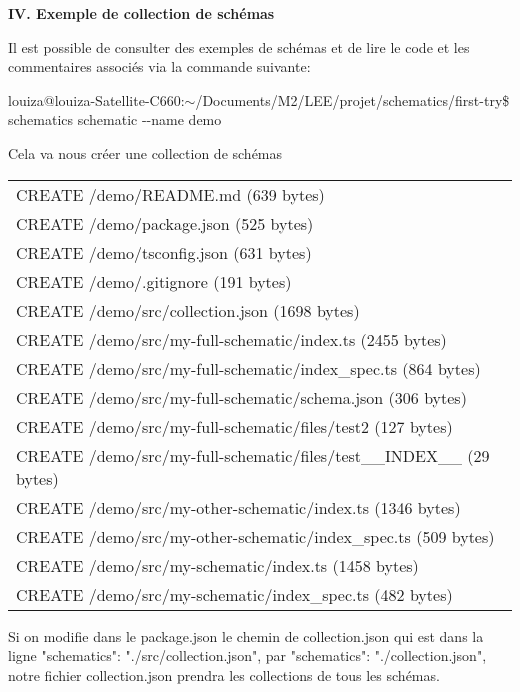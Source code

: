 \documentclass[12pt,french]{article}
\begin{document}
	\textbf{IV. Exemple de collection de schémas}\newline
	
	Il est possible de consulter des exemples  de schémas et de lire le code et les commentaires associés via la commande suivante:\newline
	
	louiza@louiza-Satellite-C660:$\sim$/Documents/M2/LEE/projet/schematics/first-try\$ schematics schematic \--\--name demo\newline
	
	Cela va nous créer une collection de schémas\newline
		
	\begin{tabular}{l}
		CREATE /demo/README.md (639 bytes)\\
		CREATE /demo/package.json (525 bytes)
\\
		CREATE /demo/tsconfig.json (631 bytes)
\\
		CREATE /demo/.gitignore (191 bytes)
\\
		CREATE /demo/src/collection.json (1698 bytes)\\
		CREATE /demo/src/my-full-schematic/index.ts (2455 bytes)
\\
		CREATE /demo/src/my-full-schematic/index\_spec.ts (864 bytes)\\
		CREATE /demo/src/my-full-schematic/schema.json (306 bytes)
\\
		CREATE /demo/src/my-full-schematic/files/test2 (127 bytes)
\\
		CREATE /demo/src/my-full-schematic/files/test\_\_INDEX\_\_ (29 bytes)\\
		CREATE /demo/src/my-other-schematic/index.ts (1346 bytes)
\\
		CREATE /demo/src/my-other-schematic/index\_spec.ts (509 bytes)\\
		CREATE /demo/src/my-schematic/index.ts (1458 bytes)
\\
		CREATE /demo/src/my-schematic/index\_spec.ts (482 bytes)\\
	\end{tabular}\newline

	Si on modifie dans le package.json le chemin de collection.json qui est dans la ligne "schematics": "./src/collection.json", par "schematics": "./collection.json", notre fichier collection.json prendra les collections de tous les schémas.\newline
	
\end{document}

